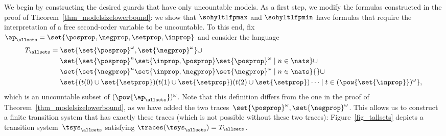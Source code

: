 We begin by constructing the desired guards that have only uncountable models.
As a first step, we modify the formulas constructed in the proof of Theorem~\ref{thm_modelsizelowerbound}: we show that $\sohyltlfpmax$ and $\sohyltlfpmin$ have formulas that require the interpretation of a free second-order variable to be uncountable.
To this end, fix $\ap_\allsets = \set{\posprop, \negprop, \setprop,\inprop}$ and consider the language
\begin{align*}
T_\allsets ={}&{} \set{ \set{\posprop}^\omega,\set{\negprop}^\omega} \cup\\
&{}\set{\set{\posprop}^n \set{\inprop,\posprop} \set{\posprop}^\omega \mid n\in\nats} \cup\\
&{}\set{\set{\negprop}^n \set{\inprop,\negprop} \set{\negprop}^\omega \mid n\in\nats}{} \cup\\
&{}\set{ (t(0) \cup \set{\setprop})(t(1) \cup \set{\setprop})(t(2) \cup \set{\setprop}) \cdots \mid t \in (\pow{\set{\inprop}})^\omega},
\end{align*}
which is an uncountable subset of $(\pow{\ap_\allsets})^\omega$.
Note that this definition differs from the one in the proof of Theorem~\ref{thm_modelsizelowerbound}, as we have added the two traces~$\set{\posprop}^\omega,\set{\negprop}^\omega$.
This allows us to construct a finite transition system that has exactly these traces (which is not possible without these two traces): Figure~\ref{fig_tallsets} depicts a transition system~$\tsys_\allsets$ satisfying $\traces(\tsys_\allsets) = T_\allsets$.

